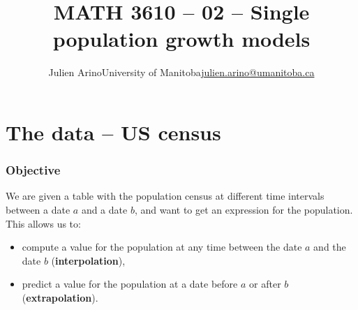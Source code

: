 \documentclass[aspectratio=169]{beamer}
\title[Single population growth]{MATH 3610 -- 02 -- Single population growth models}
\author{\texorpdfstring{Julien Arino\newline University of Manitoba\newline\url{julien.arino@umanitoba.ca}}{Julien Arino}}
\date{}
\begin{document}






\section{The data -- US census}



\begin{frame}\frametitle{Objective}
We are given a table with the population census at different time intervals between a date $a$ and a date $b$, and want to get an expression for the population. This allows us to: 
\begin{itemize}
\item compute a value for the population at any time between the date $a$ and the date $b$ (\textbf{interpolation}),
\item predict a value for the population at a date before $a$ or after $b$ (\textbf{extrapolation}).
\end{itemize}
\end{frame}
\end{document}
